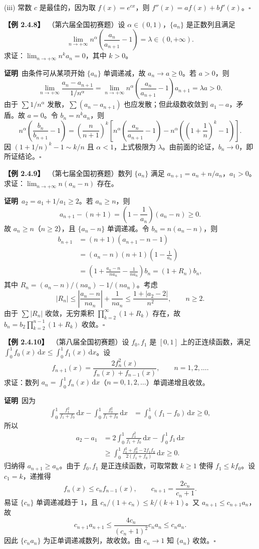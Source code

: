\documentclass[UTF8,a4paper,11pt]{ctexart}
\newcommand{\ex}[1]{\par\medskip\noindent\textbf{【例 #1】}\ }
\newcommand{\pf}{\par\noindent\textbf{证明}\ }
\begin{document}
(iii) 常数 $c$ 是最佳的，因为取 $f(x)=e^{cx}$，则 $f''(x)=af(x)+bf'(x)$。\hfill$\square$

\ex{2.4.8}（第六届全国初赛题）设 $\alpha\in(0,1)$，$\{a_n\}$ 是正数列且满足
\[
\lim_{n\to+\infty}n^\alpha\left(\frac{a_n}{a_{n+1}}-1\right)=\lambda\in(0,+\infty).
\]
求证：$\lim_{n\to+\infty}n^ka_n=0$，其中 $k>0$。
\pf 由条件可从某项开始 $\{a_n\}$ 单调递减，故 $a_n\to a\ge0$。若 $a>0$，则
\[
\lim_{n\to+\infty}\frac{a_n-a_{n+1}}{1/n^\alpha}
=\lim_{n\to+\infty}n^\alpha\left(\frac{a_n}{a_{n+1}}-1\right)a_{n+1}=\lambda a>0.
\]
由于 $\sum 1/n^\alpha$ 发散，$\sum(a_n-a_{n+1})$ 也应发散；但此级数收敛到 $a_1-a$，矛盾。故 $a=0$。令 $b_n=n^ka_n$，则
\[
n^\alpha\left(\frac{b_n}{b_{n+1}}-1\right)
=\left(\frac{n}{n+1}\right)^k
\left[n^\alpha\left(\frac{a_n}{a_{n+1}}-1\right)
-n^\alpha\left(\left(1+\frac1n\right)^k-1\right)\right].
\]
因 $\left(1+1/n\right)^k-1\sim k/n$ 且 $\alpha<1$，上式极限为 $\lambda$。由前面的论证，$b_n\to0$，即所证结论。\hfill$\square$

\ex{2.4.9}（第七届全国初赛题）数列 $\{a_n\}$ 满足 $a_{n+1}=a_n+n/a_n$，$a_1>0$。求证：$\lim_{n\to+\infty}n(a_n-n)$ 存在。
\pf $a_2=a_1+1/a_1\ge2$。若 $a_n\ge n$，则
\[
a_{n+1}-(n+1)=\left(1-\frac1{a_n}\right)(a_n-n)\ge0.
\]
故 $a_n\ge n$（$n\ge2$），且 $\{a_n-n\}$ 单调递减。令 $b_n=n(a_n-n)$，则
\begin{align*}
b_{n+1}&=(n+1)(a_{n+1}-n-1)\\
&=(a_n-n)(n+1)\left(1-\frac1{a_n}\right)\\
&=\left(1+\frac{a_n-n}{na_n}-\frac1{na_n}\right)b_n
=(1+R_n)b_n,
\end{align*}
其中 $R_n=(a_n-n)/(na_n)-1/(na_n)$。考虑
\[
|R_n|\le\left|\frac{a_n-n}{na_n}\right|+\frac1{na_n}
\le\frac{1+|a_2-2|}{n^2},\qquad n\ge2.
\]
由于 $\sum |R_n|$ 收敛，无穷乘积 $\prod_{k=2}^{\infty}(1+R_k)$ 存在，故 $b_n=b_2\prod_{k=2}^{n-1}(1+R_k)$ 收敛。\hfill$\square$

\ex{2.4.10}（第八届全国初赛题）设 $f_0,f_1$ 是 $[0,1]$ 上的正连续函数，满足 $\int_0^1f_0(x)\,\mathrm dx\le\int_0^1f_1(x)\,\mathrm dx$。设
\[
f_{n+1}(x)=\frac{2f_n^2(x)}{f_n(x)+f_{n-1}(x)},\qquad n=1,2,\ldots.
\]
求证：数列 $a_n=\int_0^1f_n(x)\,\mathrm dx$（$n=0,1,2,\ldots$）单调递增且收敛。
\pf 因为
\begin{align*}
\int_0^1\frac{f_1^2}{f_1+f_0}\,\mathrm dx
-\int_0^1\frac{f_0^2}{f_1+f_0}\,\mathrm dx
&=\int_0^1(f_1-f_0)\,\mathrm dx\ge0,
\end{align*}
所以
\begin{align*}
a_2-a_1
&=2\int_0^1\frac{f_1^2}{f_1+f_0}\,\mathrm dx-\int_0^1f_1\,\mathrm dx\\
&\ge\int_0^1\frac{f_1^2+f_0^2-2f_1f_0}{2(f_1+f_0)}\,\mathrm dx\ge0.
\end{align*}
归纳得 $a_{n+1}\ge a_n$。由于 $f_0,f_1$ 是正连续函数，可取常数 $k\ge1$ 使得 $f_1\le kf_0$。设 $c_1=k$，递推得
\[
f_n(x)\le c_nf_{n-1}(x),\qquad c_{n+1}=\frac{2c_n}{c_n+1}.
\]
易证 $\{c_n\}$ 单调递减趋于 $1$，且 $c_n/(1+c_n)\le k/(k+1)$。又 $a_{n+1}\le c_{n+1}a_n$，故
\[
c_{n+1}a_{n+1}\le\frac{4c_n}{(c_n+1)^2}c_na_n\le c_na_n.
\]
因此 $\{c_na_n\}$ 为正单调递减数列，故收敛。由 $c_n\to1$ 知 $\{a_n\}$ 收敛。\hfill$\square$
\end{document}
